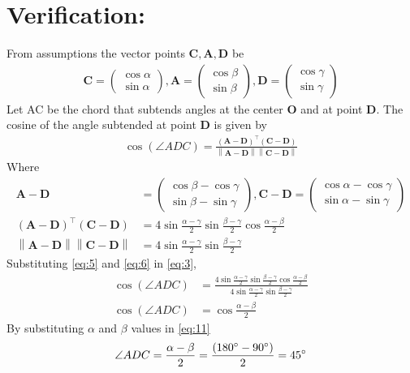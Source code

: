 \documentclass[12pt]{article}
\providecommand{\norm}[1]{\left\lVert#1\right\rVert}
\newcommand{\myvec}[1]{\ensuremath{\begin{pmatrix}#1\end{pmatrix}}}
\let\vec\mathbf
\begin{document}
\section*{Verification:}
From assumptions the vector points $\vec{C,A,D}$ be
\begin{align}
	\vec{C} = \myvec{\cos\alpha\\\sin\alpha},
	\vec{A} = \myvec{\cos\beta\\\sin\beta},
	\vec{D} = \myvec{\cos\gamma\\\sin\gamma}
\end{align}
Let AC be the chord that subtends angles at the center $\vec{O}$ and at point $\vec{D}$. The cosine of the angle subtended at point $\vec{D}$ is given by
\begin{align}
	\cos(\angle ADC) = \frac{\vec{(A-D)^\top(C-D)}}{\norm{\vec{A-D}}\norm{\vec{C-D}}}
	\label{eq:3}
\end{align}
Where
 \begin{align}
	 \vec{A-D}& = \myvec{\cos\beta - \cos\gamma\\\sin\beta - \sin\gamma},
	 \vec{C-D} = \myvec{\cos\alpha - \cos\gamma\\\sin\alpha - \sin\gamma}\\
	 \label{eq:5} \vec{(A-D)^\top(C-D)}&= 4\sin\frac{\alpha-\gamma}2\sin\frac{\beta-\gamma}2\cos\frac{\alpha-\beta}2\\
	 \norm{\vec{A-D}}\norm{\vec{C-D}}& = 4 \sin\frac{\alpha-\gamma}2\sin\frac{\beta-\gamma}2
	\label{eq:6}
\end{align}
Substituting \eqref{eq:5} and \eqref{eq:6} in \eqref{eq:3},
\begin{align}
	\cos(\angle ADC) &= \frac{4\sin\frac{\alpha-\gamma}{2}\sin\frac{\beta-\gamma}{2}\cos\frac{\alpha-\beta}{2}}{4 \sin\frac{\alpha-\gamma}2\sin\frac{\beta-\gamma}2}\\
	\cos(\angle ADC) &= \cos\frac{\alpha-\beta}{2}
	\label{eq:11}
\end{align}
By substituting $\alpha$ and $\beta$ values in \eqref{eq:11}
\begin{align}
\angle ADC = \frac{\alpha-\beta}{2}=\frac{(180\degree - 90\degree )}{2}=45\degree
\end{align}
\end{document}
